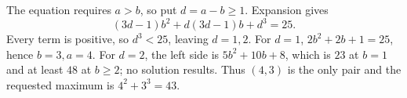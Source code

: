 The equation requires $a>b$, so put $d=a-b\ge1$. Expansion gives
\[
(3d-1)b^2+d(3d-1)b+d^3=25.
\]
Every term is positive, so $d^3<25$, leaving $d=1,2$. For $d=1$, $2b^2+2b+1=25$, hence $b=3,a=4$. For $d=2$, the left side is $5b^2+10b+8$, which is $23$ at $b=1$ and at least $48$ at $b\ge2$; no solution results. Thus $(4,3)$ is the only pair and the requested maximum is $\boxed{4^2+3^3=43}$.
